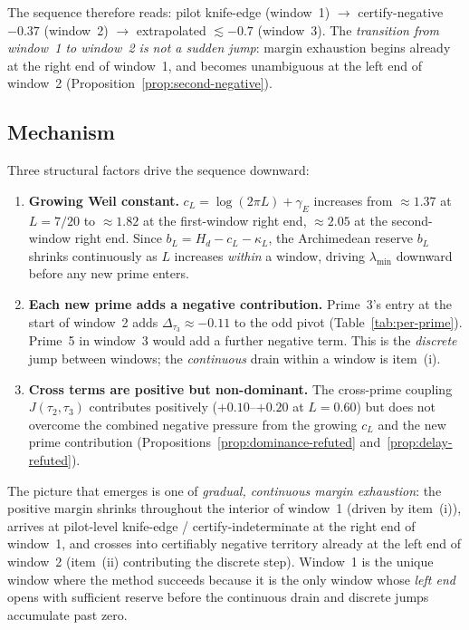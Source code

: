 \documentclass[12pt,a4paper]{amsart}
\theoremstyle{plain}
\theoremstyle{definition}
\newcommand{\cL}{c_L}
\newcommand{\bL}{b_L}
\newcommand{\Jcross}{J(\tau_2,\tau_3)}
\begin{document}
The sequence therefore reads: pilot knife-edge (window~1) $\to$
certify-negative $-0.37$ (window~2) $\to$ extrapolated $\lesssim -0.7$
(window~3).  The \emph{transition from window~1 to window~2 is not a
sudden jump}: margin exhaustion begins already at the right end of
window~1, and becomes unambiguous at the left end of window~2
(Proposition~\ref{prop:second-negative}).

\subsection{Mechanism}

Three structural factors drive the sequence downward:

\begin{enumerate}[label=(\roman*)]
  \item \textbf{Growing Weil constant.}  $\cL = \log(2\pi L)+\gamma_E$
    increases from $\approx 1.37$ at $L=7/20$ to $\approx 1.82$ at the
    first-window right end, $\approx 2.05$ at the second-window right end.
    Since $\bL = H_d - \cL - \kappa_L$, the Archimedean reserve $\bL$
    shrinks continuously as $L$ increases \emph{within} a window, driving
    $\lambda_{\min}$ downward before any new prime enters.

  \item \textbf{Each new prime adds a negative contribution.}  Prime~3's
    entry at the start of window~2 adds $\Delta_{\tau_3} \approx -0.11$
    to the odd pivot (Table~\ref{tab:per-prime}).  Prime~5 in window~3
    would add a further negative term.  This is the \emph{discrete} jump
    between windows; the \emph{continuous} drain within a window is item~(i).

  \item \textbf{Cross terms are positive but non-dominant.}  The cross-prime
    coupling $\Jcross$ contributes positively ($+0.10$--$+0.20$ at $L=0.60$)
    but does not overcome the combined negative pressure from the growing
    $\cL$ and the new prime contribution (Propositions~\ref{prop:dominance-refuted}
    and~\ref{prop:delay-refuted}).
\end{enumerate}

The picture that emerges is one of \emph{gradual, continuous margin exhaustion}:
the positive margin shrinks throughout the interior of window~1 (driven by
item~(i)), arrives at pilot-level knife-edge / certify-indeterminate at the
right end of window~1, and crosses into certifiably negative territory already
at the left end of window~2 (item~(ii) contributing the discrete step).
Window~1 is the unique window where the method succeeds because it is the only
window whose \emph{left end} opens with sufficient reserve before the
continuous drain and discrete jumps accumulate past zero.
\end{document}
